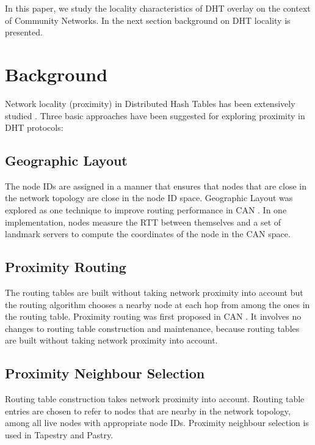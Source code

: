 \documentclass[conference]{IEEEtran}
\begin{document}
In this paper, we study the locality characteristics of DHT overlay on the context of Community Networks. In the next section background on DHT locality is presented.

\section{Background}

Network locality (proximity) in Distributed Hash Tables has been extensively studied \cite{b10, b11, b12, b31}. Three basic approaches have been suggested for exploring proximity in DHT protocols:

\subsection{Geographic Layout}

The node IDs are assigned in a manner that ensures that nodes that are close in the network topology are close in the node ID space. Geographic Layout was explored as one technique to improve routing performance in CAN \cite{b4}. In one implementation, nodes measure the RTT between themselves and a set of landmark servers to compute the coordinates of the node in the CAN space.

\subsection{Proximity Routing}

The routing tables are built without taking network proximity into account but the routing algorithm chooses a nearby node at each hop from among the ones in the routing table. Proximity routing was first proposed in CAN \cite{b4}. It involves no changes to routing table construction and maintenance, because routing tables are built without taking network proximity into account.

\subsection{Proximity Neighbour Selection}

Routing table construction takes network proximity into account. Routing table entries are chosen to refer to nodes that are nearby in the network topology, among all live nodes with appropriate node IDs. Proximity neighbour selection is used in Tapestry and Pastry.
\end{document}
